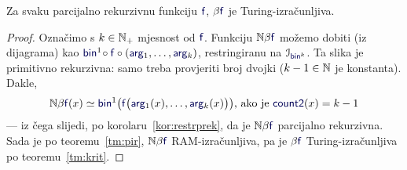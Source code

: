 

\begin{teorem}[{name=[Turing-izračunljivost parcijalno rekurzivnih brojevnih funkcija]}]\label{tm:pibt}
Za svaku parcijalno rekurzivnu funkciju $\f f$, $\beta\f f$ je Turing-izračunljiva.
\end{teorem}
\begin{proof}
Označimo s $k\in{\mathbb N}_+$ mjesnost od $\f f$. %
    Funkciju $\N\beta\f f$ možemo dobiti (iz dijagrama) kao $\f{bin}^1\!\circ\f f\circ(\f{arg}_1,\dotsc,\f{arg}_k)$, restringiranu na $\im{\f{bin}^k}$. Ta slika je primitivno rekurzivna: samo treba provjeriti broj dvojki ($k-1\in{\mathbb N}$ je konstanta).
Dakle,
\begin{equation}
\label{eq:defNbetaf}
    \N\beta\f f(x)\simeq\f{bin}^1\bigl(\f f\bigl(\f{arg}_1(x),\dotsc,\f{arg}_k(x)\bigr)\bigr)\text{, ako je }\f{count2}(x)=k-1
\end{equation}
--- iz čega slijedi, po korolaru~\ref{kor:restrprek}, da je $\N\beta\f f$ parcijalno rekurzivna. Sada je po teoremu~\ref{tm:pir}, $\N\beta\f f$ RAM-izračunljiva, pa je $\beta\f f$ Turing-iz\-rač\-un\-lji\-va po teoremu~\ref{tm:krit}.
\end{proof}

%
